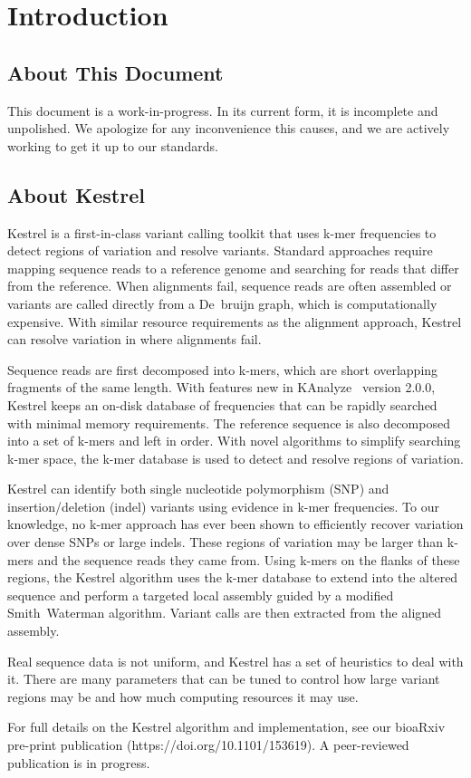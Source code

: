 
\section{Introduction}
\label{sec.intro}

\subsection{About This Document}
\label{sec.intro.aboutdoc}

This document is a work-in-progress. In its current form, it is incomplete and unpolished. We apologize for any inconvenience this causes, and we are actively working to get it up to our standards.


\subsection{About Kestrel}
\label{sec.intro.aboutkestrel}

Kestrel is a first-in-class variant calling toolkit that uses k-mer frequencies to detect regions of variation and resolve variants. Standard approaches require mapping sequence reads to a reference genome and searching for reads that differ from the reference. When alignments fail, sequence reads are often assembled or variants are called directly from a De~bruijn graph, which is computationally expensive. With similar resource requirements as the alignment approach, Kestrel can resolve variation in where alignments fail.

Sequence reads are first decomposed into k-mers, which are short overlapping fragments of the same length. With features new in KAnalyze~\cite{Audano2014} version 2.0.0, Kestrel keeps an on-disk database of frequencies that can be rapidly searched with minimal memory requirements. The reference sequence is also decomposed into a set of k-mers and left in order. With novel algorithms to simplify searching k-mer space, the k-mer database is used to detect and resolve regions of variation.

Kestrel can identify both single nucleotide polymorphism (SNP) and insertion/deletion (indel) variants using evidence in k-mer frequencies. To our knowledge, no k-mer approach has ever been shown to efficiently recover variation over dense SNPs or large indels. These regions of variation may be larger than k-mers and the sequence reads they came from. Using k-mers on the flanks of these regions, the Kestrel algorithm uses the k-mer database to extend into the altered sequence and perform a targeted local assembly guided by a modified Smith~Waterman algorithm. Variant calls are then extracted from the aligned assembly.

Real sequence data is not uniform, and Kestrel has a set of heuristics to deal with it. There are many parameters that can be tuned to control how large variant regions may be and how much computing resources it may use.

For full details on the Kestrel algorithm and implementation, see our bioaRxiv pre-print publication (https://doi.org/10.1101/153619). A peer-reviewed publication is in progress.
